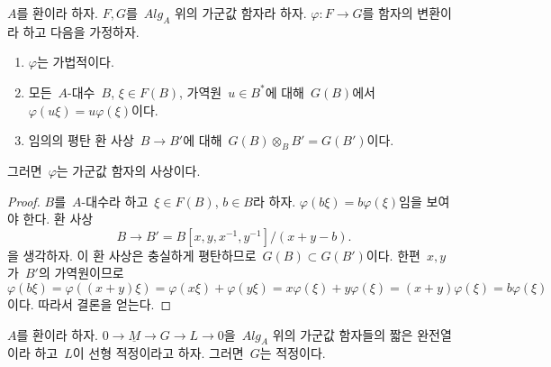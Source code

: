 \begin{lemma}
\label{lemma-flat-linear-functor}
$A$를 환이라 하자.
$F, G$를\  $\textit{Alg}_A$ 위의 가군값 함자라 하자.
$\varphi : F \to G$를 함자의 변환이라 하고 다음을 가정하자.
\begin{enumerate}
\item $\varphi$는 가법적이다.
\item 모든\  $A$-대수\  $B$, $\xi \in F(B)$, 가역원\  $u \in B^*$에 대해\ 
$G(B)$에서\  $\varphi(u\xi) = u\varphi(\xi)$이다.
\item 임의의 평탄 환 사상\  $B \to B'$에 대해\ 
$G(B) \otimes_B B' = G(B')$이다.
\end{enumerate}
그러면\  $\varphi$는 가군값 함자의 사상이다.
\end{lemma}

\begin{proof}
$B$를\  $A$-대수라 하고\  $\xi \in F(B)$, $b \in B$라 하자.
$\varphi(b \xi) = b \varphi(\xi)$임을 보여야 한다. 환 사상
$$
B \to B' = B[x, y, x^{-1}, y^{-1}]/(x + y - b).
$$
을 생각하자. 이 환 사상은 충실하게 평탄하므로\ 
$G(B) \subset G(B')$이다. 한편\  $x, y$가\  $B'$의 가역원이므로
$$
\varphi(b\xi) = \varphi((x + y)\xi) =
\varphi(x\xi) + \varphi(y\xi) = x\varphi(\xi) + y\varphi(\xi)
= (x + y)\varphi(\xi) = b\varphi(\xi)
$$
이다. 따라서 결론을 얻는다.
\end{proof}

\begin{lemma}
\label{lemma-extension-adequate-key}
$A$를 환이라 하자.
$0 \to \underline{M} \to G \to L \to 0$을\  $\textit{Alg}_A$ 위의
가군값 함자들의 짧은 완전열이라 하고\  $L$이 선형 적정이라고 하자.
그러면\  $G$는 적정이다.
\end{lemma}

